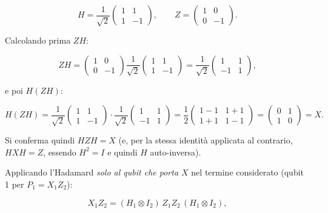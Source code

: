 \documentclass[11pt,a4paper]{article}
\begin{document}
\begin{equation}
H = \frac{1}{\sqrt2}\begin{pmatrix}1&1\\1&-1\end{pmatrix}, \qquad Z=\begin{pmatrix}1&0\\0&-1\end{pmatrix}.
\end{equation}

Calcolando prima $ZH$:

\begin{equation}
ZH = \begin{pmatrix}1&0\\0&-1\end{pmatrix}\frac{1}{\sqrt2}\begin{pmatrix}1&1\\1&-1\end{pmatrix} = \frac{1}{\sqrt2}\begin{pmatrix}1&1\\-1&1\end{pmatrix},
\end{equation}

e poi $H(ZH)$:

\begin{equation}
H(ZH) = \frac{1}{\sqrt2}\begin{pmatrix}1&1\\1&-1\end{pmatrix}\cdot\frac{1}{\sqrt2}\begin{pmatrix}1&1\\-1&1\end{pmatrix} = \frac{1}{2}\begin{pmatrix}1-1 & 1+1\\ 1+1 & 1-1\end{pmatrix} = \begin{pmatrix}0&1\\1&0\end{pmatrix} = X.
\end{equation}

Si conferma quindi $HZH=X$ (e, per la stessa identità applicata al contrario, $HXH=Z$, essendo $H^2=I$ e quindi $H$ auto-inversa).

Applicando l'Hadamard \emph{solo al qubit che porta $X$} nel termine considerato (qubit 1 per $P_1=X_1Z_2$):

\begin{equation}
X_1Z_2 = (H_1\otimes I_2)\,Z_1Z_2\,(H_1\otimes I_2),
\end{equation}
\end{document}
